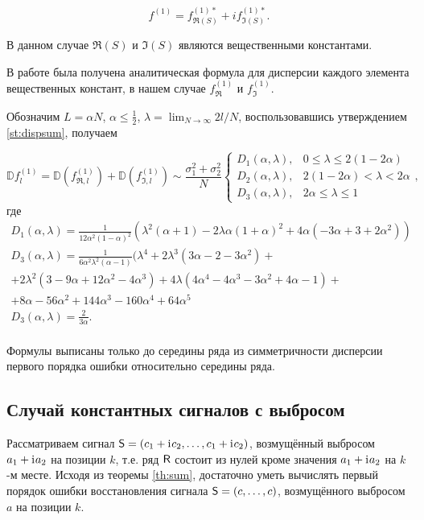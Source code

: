\documentclass[12pt,a4paper]{article}
\begin{document}
$$f^{(1)} = f^{(1)*}_{\Re(S)} + if^{(1)*}_{\Im(S)}.$$

В данном случае $\Re(S)$ и $\Im(S)$ являются вещественными константами.

В работе \cite{Vlas2008} была получена аналитическая формула для дисперсии каждого элемента вещественных констант, в нашем случае $f^{(1)}_{\Re}$ и $f^{(1)}_{\Im}$.

Обозначим $L = \alpha N$, $\alpha \leq \frac{1}{2}$, $\lambda = \lim_{N\to\infty} 2 l / N$, воспользовавшись утверждением \ref{st:dispsum}, получаем

$$
\mathbb{D} f^{(1)}_l = \mathbb{D} (f^{(1)}_{\Re, l}) + \mathbb{D} (f^{(1)}_{\Im, l}) \sim \frac{\sigma^2_1 + \sigma^2_2}{N}
\begin{cases}
	D_1(\alpha, \lambda), &\text{$0 \leq \lambda \leq 2 (1 - 2\alpha)$}\\
	D_2(\alpha, \lambda), &\text{$2 (1 - 2\alpha) < \lambda < 2\alpha$}\\
	D_3(\alpha, \lambda), &\text{$2\alpha \leq \lambda \leq 1$}
\end{cases},
$$
где
\begin{gather*}
	D_1(\alpha, \lambda) = \frac{1}{12 \alpha^2(1 - \alpha)^2} (\lambda^2(\alpha + 1) - 2\lambda\alpha(1 + \alpha)^2 + 4 \alpha(-3\alpha + 3 + 2\alpha^2))\\
	D_3(\alpha, \lambda) = \frac{1}{6 \alpha^2\lambda^2 (\alpha - 1)} (\lambda^4 + 2\lambda^3(3\alpha -2 -3\alpha^2) + \\
	+ 2\lambda^2(3 - 9\alpha + 12\alpha^2 - 4\alpha^3) + 4\lambda(4 \alpha^4 - 4\alpha^3 - 3\alpha^2 + 4\alpha - 1) +\\
	+ 8\alpha - 56 \alpha^2 + 144\alpha^3 - 160\alpha^4 + 64\alpha^5\\
	D_3(\alpha, \lambda) = \frac{2}{3\alpha}.\\
\end{gather*}

Формулы выписаны только до середины ряда из симметричности дисперсии первого порядка ошибки относительно середины ряда.
 

\subsection{Случай константных сигналов с выбросом}
Рассматриваем сигнал $\textsf{S} = (c_1 + \mathrm{i}\mkern1mu c_2, \ldots, c_1 + \mathrm{i}\mkern1mu c_2)$, возмущённый выбросом $a_1 + \mathrm{i}\mkern1mu a_2$ на позиции $k$, т.е. ряд $\textsf{R}$ состоит из нулей кроме значения $a_1 + \mathrm{i}\mkern1mu a_2$ на $k$-м месте. Исходя из теоремы \ref{th:sum}, достаточно уметь вычислять первый порядок ошибки восстановления сигнала $\textsf{S} = (c, \ldots, c)$, возмущённого выбросом $a$ на позиции $k$.
\end{document}
